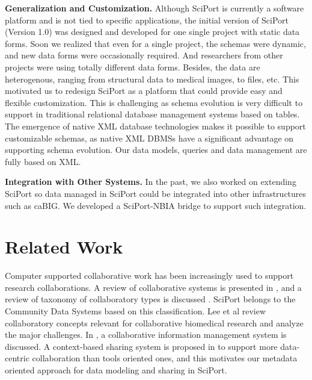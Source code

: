 \documentclass{singlecol-new}
\theoremstyle{TH}{
\newtheorem{lemma}{Lemma}
\newtheorem{theorem}[lemma]{Theorem}
\newtheorem{corrolary}[lemma]{Corrolary}
\newtheorem{conjecture}[lemma]{Conjecture}
\newtheorem{proposition}[lemma]{Proposition}
\newtheorem{claim}[lemma]{Claim}
\newtheorem{stheorem}[lemma]{Wrong Theorem}
\newtheorem{algorithm}{Algorithm}
}
\theoremstyle{THrm}{
\newtheorem{definition}{Definition}[section]
\newtheorem{question}{Question}[section]
\newtheorem{remark}{Remark}
\newtheorem{scheme}{Scheme}
}
\theoremstyle{THhit}{
\newtheorem{case}{Case}[section]
}
\begin{document}
\textbf{Generalization and Customization.} Although SciPort is
currently a software platform and is not tied to specific
applications, the initial version of SciPort (Version 1.0) was
designed and developed for one single project with static data
forms. Soon we realized that even for a single project, the schemas
were dynamic, and new data forms were occasionally required. And
researchers from other projects were using totally different data
forms. Besides, the data are heterogenous, ranging from structural
data to medical images, to  files, etc. This motivated us to
redesign SciPort as a platform that could provide easy and flexible
customization. This is challenging as schema evolution is very
difficult to support in traditional relational database management
systems based on tables. The emergence of native XML database
technologies makes it possible to support customizable schemas, as
native XML DBMSs have a significant advantage on supporting schema
evolution. Our data models, queries and data management are fully
based on XML.

\textbf{Integration with Other Systems.} In the past, we also worked
on extending SciPort so data managed in SciPort could be integrated
into other infrastructures such as caBIG. We developed a
SciPort-NBIA \cite{nbia} bridge to support such integration.


\section{Related Work}

Computer supported collaborative work has been increasingly used to
support research collaborations. A review of collaborative systems
is presented in \cite{bafoutsou2002281}, and a review of taxonomy of
collaboratory types is discussed \cite{zimmerman07taxonomy}. SciPort
belongs to the Community Data Systems based on this classification.
Lee et al review collaboratory concepts relevant for collaborative
biomedical research \cite{lee09} and analyze the major challenges.
In \cite{myneni10col}, a collaborative information management system
is discussed.  A context-based sharing system is proposed in
\cite{chin04context} to support more data-centric collaboration than
tools oriented ones, and this motivates our metadata oriented
approach for data modeling and sharing in SciPort.
\end{document}
